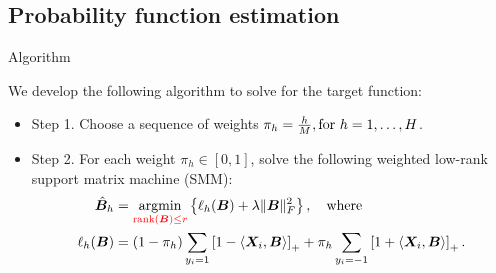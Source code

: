 \documentclass[compress,dvipsnames]{beamer}
\let\olditem\item
\renewcommand\item{\olditem\justifying}
\begin{document}
\subsection{Probability function estimation}
\begin{frame}{Algorithm}

We develop the following algorithm to solve for the target function: 
\begin{itemize}
\item Step 1. Choose a sequence of weights $\pi_h = {h\over M}, \text{for }h=1,\ldots,H$.
\item Step 2. For each weight $\pi_h\in[0,1]$, solve the following {\color{red}weighted low-rank support matrix machine (SMM)}:
\begin{align}\label{eq:sequence}
\hat \mB_h&=\argmin_{{\color{red}\text{rank}(\mB)\leq r}} \left\{\ell_h(\mB)+\lambda\FnormSize{}{\mB}^2\right\},\quad \text{where}\\
 \ell_h(\mB) &= (1-\pi_h)\sum_{y_i=1}\left[1-\langle \mX_i, \mB \rangle \right]_{+}+ \pi_h\sum_{y_{i}=-1}\left[1+\langle \mX_i, \mB\rangle\right]_{+}.
\vspace{-.5cm}
\end{align}
\end{itemize}
\end{frame}
\end{document}
